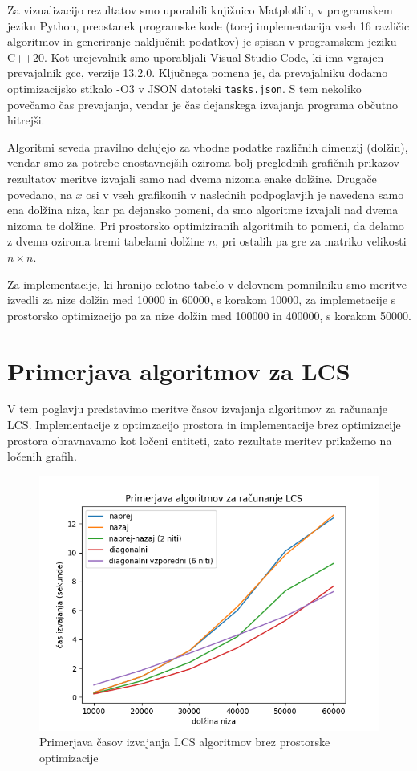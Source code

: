 \documentclass[a4paper,12pt,openright]{book}
\begin{document}
Za vizualizacijo rezultatov smo uporabili knjižnico Matplotlib, v programskem jeziku Python, preostanek programske kode (torej implementacija vseh 16 različic algoritmov in generiranje naključnih podatkov) je spisan v programskem jeziku C++20. Kot urejevalnik smo uporabljali Visual Studio Code, ki ima vgrajen prevajalnik gcc, verzije 13.2.0. Ključnega pomena je, da prevajalniku dodamo optimizacijsko stikalo -O3 \cite{compilerFlag} v JSON datoteki \texttt{tasks.json}. S tem nekoliko povečamo čas prevajanja, vendar je čas dejanskega izvajanja programa občutno hitrejši. 

\bigskip

Algoritmi seveda pravilno delujejo za vhodne podatke različnih dimenzij (dolžin), vendar smo za potrebe enostavnejših oziroma bolj preglednih grafičnih prikazov rezultatov meritve izvajali samo nad dvema nizoma enake dolžine. Drugače povedano, na $x$ osi v vseh grafikonih v naslednih podpoglavjih je navedena samo ena dolžina niza, kar pa dejansko pomeni, da smo algoritme izvajali nad dvema nizoma te dolžine. Pri prostorsko optimiziranih algoritmih to pomeni, da delamo z dvema oziroma tremi tabelami dolžine $n$, pri ostalih pa gre za matriko velikosti $n \times n$. 

Za implementacije, ki hranijo celotno tabelo v delovnem pomnilniku smo meritve izvedli za nize dolžin med 10000 in 60000, s korakom 10000, za implemetacije s prostorsko optimizacijo pa za nize dolžin med 100000 in 400000, s korakom 50000. 

\section{Primerjava algoritmov za LCS}

V tem poglavju predstavimo meritve časov izvajanja algoritmov za računanje LCS. Implementacije z optimzacijo prostora in implementacije brez optimizacije prostora obravnavamo kot ločeni entiteti, zato rezultate meritev prikažemo na ločenih grafih. 

\begin{figure}[htb]
\centering
\includegraphics[width=1.0\textwidth]{plots/LCStotal.png}
\caption{Primerjava časov izvajanja LCS algoritmov brez prostorske optimizacije}
\label{comparison1}
\end{figure}
\end{document}
